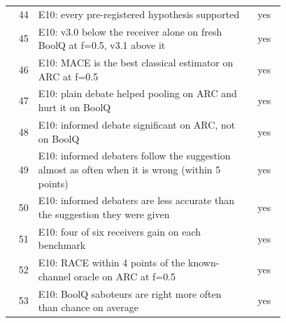 \begin{longtable}{@{}r p{0.78\linewidth} c@{}}
44 & E10: every pre-registered hypothesis supported & yes\\
45 & E10: v3.0 below the receiver alone on fresh BoolQ at f=0.5, v3.1 above it & yes\\
46 & E10: MACE is the best classical estimator on ARC at f=0.5 & yes\\
47 & E10: plain debate helped pooling on ARC and hurt it on BoolQ & yes\\
48 & E10: informed debate significant on ARC, not on BoolQ & yes\\
49 & E10: informed debaters follow the suggestion almost as often when it is wrong (within 5 points) & yes\\
50 & E10: informed debaters are less accurate than the suggestion they were given & yes\\
51 & E10: four of six receivers gain on each benchmark & yes\\
52 & E10: RACE within 4 points of the known-channel oracle on ARC at f=0.5 & yes\\
53 & E10: BoolQ saboteurs are right more often than chance on average & yes\\
\bottomrule
\end{longtable}
